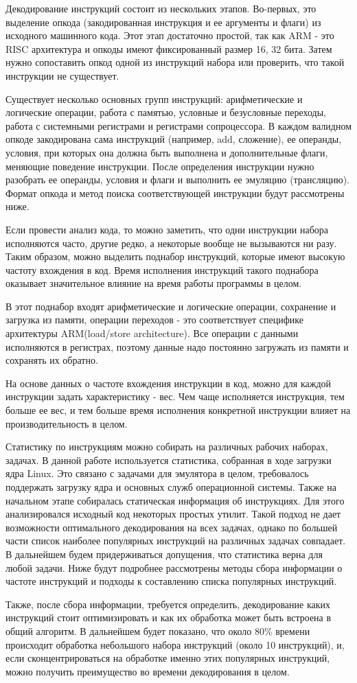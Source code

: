 Декодирование инструкций состоит из нескольких этапов. Во-первых, это выделение опкода (закодированная инструкция и ее аргументы и флаги) из исходного машинного кода. Этот этап достаточно простой, так как ARM - это RISC архитектура и опкоды имеют фиксированный размер 16, 32 бита. Затем нужно сопоставить опкод одной из инструкций набора или проверить, что такой инструкции не существует.

Существует несколько основных групп инструкций: арифметические и логические операции, работа с памятью, условные и безусловные переходы, работа с системными регистрами и регистрами сопроцессора. В каждом валидном опкоде закодирована сама инструкций (например, add, сложение), ее операнды, условия, при которых она должна быть выполнена и дополнительные флаги, меняющие поведение инструкции.  После определения инструкции нужно разобрать ее операнды, условия и флаги и выполнить ее эмуляцию (трансляцию). Формат опкода и метод поиска соответствующей инструкции будут рассмотрены ниже.

Если провести анализ кода, то можно заметить, что одни инструкции набора исполняются часто, другие редко, а некоторые вообще не вызываются ни разу. Таким образом, можно выделить поднабор инструкций, которые имеют высокую частоту вхождения в код. Время исполнения инструкций такого поднабора оказывает  значительное влияние на время работы программы в целом.

В этот поднабор входят арифметические и логические операции, сохранение и загрузка из памяти, операции переходов - это соответствует специфике архитектуры ARM(load/store architecture). Все операции с данными исполняются в регистрах, поэтому данные надо постоянно загружать из памяти и сохранять их обратно.

На основе данных о частоте вхождения инструкции в код, можно для каждой инструкции задать характеристику - вес. Чем чаще исполняется инструкция, тем больше ее вес, и тем больше время исполнения конкретной инструкции влияет на производительность в целом.

Статистику по инструкциям можно собирать на различных рабочих наборах, задачах. В данной работе используется статистика, собранная в ходе загрузки ядра Linux. Это связано с задачами для эмулятора в целом, требовалось поддержать загрузку ядра и основных служб операционной системы. Также на начальном этапе собиралась статическая информация об инструкциях. Для этого анализировался исходный код некоторых простых утилит. Такой подход не дает возможности оптимального декодирования на всех задачах, однако по большей части список наиболее популярных инструкций на различных задачах совпадает. В дальнейшем будем придерживаться допущения, что статистика верна для любой задачи. Ниже будут подробнее рассмотрены методы сбора информации о частоте инструкций и подходы к составлению списка популярных инструкций.

Также, после сбора информации, требуется определить, декодирование каких инструкций стоит оптимизировать и как их обработка может быть встроена в общий алгоритм. В дальнейшем будет показано, что около 80\% времени происходит обработка небольшого набора инструкций (около 10 инструкций), и, если сконцентрироваться на обработке именно этих популярных инструкций, можно получить преимущество во времени декодирования в целом.  